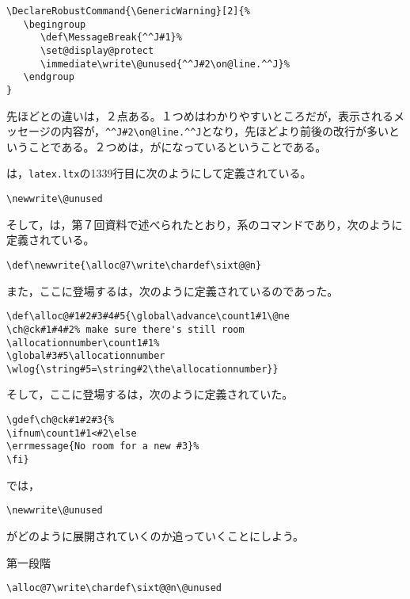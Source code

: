 \documentclass[autodetect-engine,dvipdfmx]{jsarticle}
\begin{document}
\latexltx
\begin{lstlisting}[firstnumber=879]
\DeclareRobustCommand{\GenericWarning}[2]{%
   \begingroup
      \def\MessageBreak{^^J#1}%
      \set@display@protect
      \immediate\write\@unused{^^J#2\on@line.^^J}%
   \endgroup
}
\end{lstlisting}
先ほどとの違いは，２点ある。１つめはわかりやすいところだが，表示されるメッセージの内容が，\preSub\verb|^^J#2\on@line.^^J|\preSub となり，先ほどより前後の改行が多いということである。２つめは，がになっているということである。

は，\texttt{latex.ltx}の1339行目に次のようにして定義されている。

\latexltx
\begin{lstlisting}[firstnumber=879]
\newwrite\@unused
\end{lstlisting}

そして，は，第７回資料で述べられたとおり，系のコマンドであり，次のように定義されている。

\latexltx
\begin{lstlisting}[firstnumber=332]
\def\newwrite{\alloc@7\write\chardef\sixt@@n}
\end{lstlisting}

また，ここに登場するは，次のように定義されているのであった。

\latexltx
\begin{lstlisting}[firstnumber=334]
\def\alloc@#1#2#3#4#5{\global\advance\count1#1\@ne
\ch@ck#1#4#2% make sure there's still room
\allocationnumber\count1#1%
\global#3#5\allocationnumber
\wlog{\string#5=\string#2\the\allocationnumber}}
\end{lstlisting}

そして，ここに登場するは，次のように定義されていた。

\latexltx
\begin{lstlisting}[firstnumber=334]
\gdef\ch@ck#1#2#3{%
\ifnum\count1#1<#2\else
\errmessage{No room for a new #3}%
\fi}
\end{lstlisting}

では，
\texsource
\begin{lstlisting}
\newwrite\@unused
\end{lstlisting}
がどのように展開されていくのか追っていくことにしよう。

\noindent 第一段階
\texsource
\begin{lstlisting}
\alloc@7\write\chardef\sixt@@n\@unused
\end{lstlisting}
\end{document}

